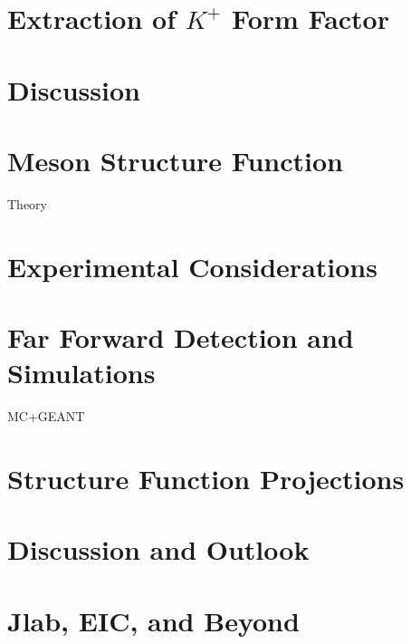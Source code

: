 \documentclass[
]{report}
\begin{document}
\hypertarget{Section-8.4}{%
\section{\texorpdfstring{Extraction of \(K^{+}\) Form
Factor}{Extraction of K\^{}\{+\} Form Factor}}\label{Section-8.4}}

\hypertarget{Section-8.5}{%
\section{Discussion}\label{Section-8.5}}

\label{Chapter-9}

\hypertarget{Section-9.1}{%
\section{Meson Structure Function}\label{Section-9.1}}

Theory

\hypertarget{Section-9.2}{%
\section{Experimental Considerations}\label{Section-9.2}}

\hypertarget{Section-9.3}{%
\section{Far Forward Detection and Simulations}\label{Section-9.3}}

MC+GEANT

\hypertarget{Section-9.4}{%
\section{Structure Function Projections}\label{Section-9.4}}

\hypertarget{Section-9.5}{%
\section{Discussion and Outlook}\label{Section-9.5}}

\label{Chapter-10}

\hypertarget{Section-10.1}{%
\section{Jlab, EIC, and Beyond}\label{Section-10.1}}
\end{document}

